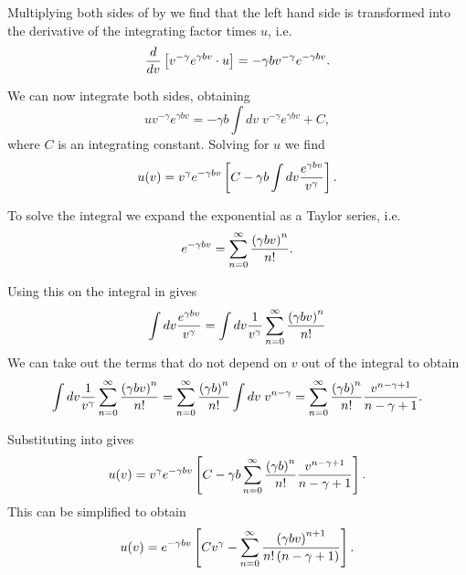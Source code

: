 Multiplying both sides of  by  we find
that the left hand side is transformed into the derivative of the integrating
factor times $u$, i.e.
\begin{equation}
  {d \over dv}\left[ v^{-\gamma} e^{\gamma b v} \cdot u \right] =
  -\gamma b v^{-\gamma} e^{-\gamma b v}.
\end{equation}

We can now integrate both sides, obtaining
\begin{equation}
u v^{-\gamma} e^{\gamma b v} =
-\gamma b \int dv \; v^{-\gamma} e^{\gamma b v} + C,
\end{equation}
where $C$ is an integrating constant. Solving for $u$ we find
\begin{equation}
  u(v) = v^{\gamma} e^{-\gamma b v} \left[ C -
  \gamma b \int dv {e^{\gamma b v} \over v^{\gamma}} \right].
  \label{eq_implicit_sol_u}
\end{equation}

To solve the integral we expand the exponential as a Taylor series, i.e.
\begin{equation}
  e^{-\gamma b v} = \sum_{n=0}^{\infty} {\left( \gamma b v \right)^n \over n!}.
\end{equation}

Using this on the integral in  gives
\begin{equation}
  \int dv {e^{\gamma b v} \over v^{\gamma}} =
  \int dv {1 \over v^{\gamma}}
  \sum_{n=0}^{\infty} {\left( \gamma b v \right)^n \over n!}
\end{equation}
We can take out the terms that do not depend on $v$ out of the integral to
obtain
\begin{equation}
\int dv {1 \over v^{\gamma}}
  \sum_{n=0}^{\infty} {\left( \gamma b v \right)^n \over n!} =
  \sum_{n=0}^{\infty} {\left( \gamma b \right)^n \over n!}
  \int dv \; v^{n - \gamma} =
  \sum_{n=0}^{\infty} {\left( \gamma b \right)^n \over n!}
  {v^{n - \gamma + 1} \over n - \gamma + 1}.
  \label{eq_integral_implicit_sol_u}
\end{equation}

Substituting  into 
gives
\begin{equation}
  u(v) = v^\gamma e^{-\gamma b v}
  \left[ C - \gamma b \sum_{n=0}^\infty {\left( \gamma b \right)^n \over n!}
  {v^{n - \gamma + 1} \over n - \gamma + 1} \right].
\end{equation}
This can be simplified to obtain
\begin{equation}
  u(v) = e^{-\gamma b v} \left[ C v^{\gamma}
  - \sum_{n=0}^\infty {\left( \gamma b v \right)^{n+1} \over
  n! \left( n - \gamma + 1 \right)} \right].
  \label{eq_SI_27_uofv}
\end{equation}

